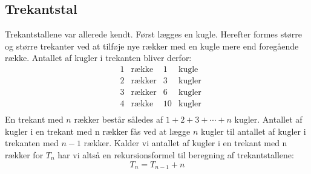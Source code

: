 \subsection{Trekantstal}
Trekantstallene var allerede kendt. Først lægges en kugle. Herefter formes større og større trekanter ved at tilføje nye rækker med en kugle mere end foregående række. Antallet af kugler i trekanten bliver derfor:
\begin{equation*}
\begin{array}{lllll}
&1 &\text{række} &1 &\text{kugle}\\
&2 &\text{rækker} &3 &\text{kugler}\\
&3 &\text{rækker} &6 &\text{kugler}\\
&4 &\text{række} &10 &\text{kugler}\\
\end{array}
\end{equation*}
En trekant med \(n\) rækker består således af \(1+2+3+ \dotsm +n\) kugler. Antallet af kugler i en trekant med n rækker fås ved at lægge \(n\) kugler til antallet af kugler i trekanten med \(n-1\) rækker. Kalder vi antallet af kugler i en trekant med n rækker for \(T_{n}\) har vi altså en rekursionsformel til beregning af trekantstallene:
\begin{equation}
 T_{n}=T_{n-1}+n\label{trekantstal}
\end{equation}

